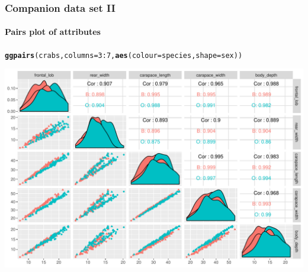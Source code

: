 \documentclass{beamer}\usepackage[]{graphicx}\usepackage[]{color}
\makeatletter
\newcommand{\hlnum}[1]{\textcolor[rgb]{0.686,0.059,0.569}{#1}}%
\newcommand{\hlopt}[1]{\textcolor[rgb]{0,0,0}{#1}}%
\newcommand{\hlstd}[1]{\textcolor[rgb]{0.345,0.345,0.345}{#1}}%
\newcommand{\hlkwc}[1]{\textcolor[rgb]{0.333,0.667,0.333}{#1}}%
\newcommand{\hlkwd}[1]{\textcolor[rgb]{0.737,0.353,0.396}{\textbf{#1}}}%
\newenvironment{kframe}{%
 \def\at@end@of@kframe{}%
 \ifinner\ifhmode%
  \def\at@end@of@kframe{\end{minipage}}%
  \begin{minipage}{\columnwidth}%
 \fi\fi%
 \def\FrameCommand##1{\hskip\@totalleftmargin \hskip-\fboxsep
 \colorbox{shadecolor}{##1}\hskip-\fboxsep
     \hskip-\linewidth \hskip-\@totalleftmargin \hskip\columnwidth}%
 \MakeFramed {\advance\hsize-\width
   \@totalleftmargin\z@ \linewidth\hsize
   \@setminipage}}%
 {\par\unskip\endMakeFramed%
 \at@end@of@kframe}
\newenvironment{knitrout}{}{} %
\makeatother
\begin{document}
\begin{frame}[fragile]
  \frametitle{Companion data set II}
  \framesubtitle{Pairs plot of attributes}

\begin{knitrout}\scriptsize
{}\color{fgcolor}\begin{kframe}
\begin{alltt}
\hlkwd{ggpairs}\hlstd{(crabs,} \hlkwc{columns} \hlstd{=} \hlnum{3}\hlopt{:}\hlnum{7}\hlstd{,} \hlkwd{aes}\hlstd{(}\hlkwc{colour} \hlstd{= species,} \hlkwc{shape} \hlstd{= sex))}
\end{alltt}
\end{kframe}
\includegraphics[width=.8\textwidth]{figures/crabs_attributes-1} 

\end{knitrout}
\end{frame}
\end{document}
